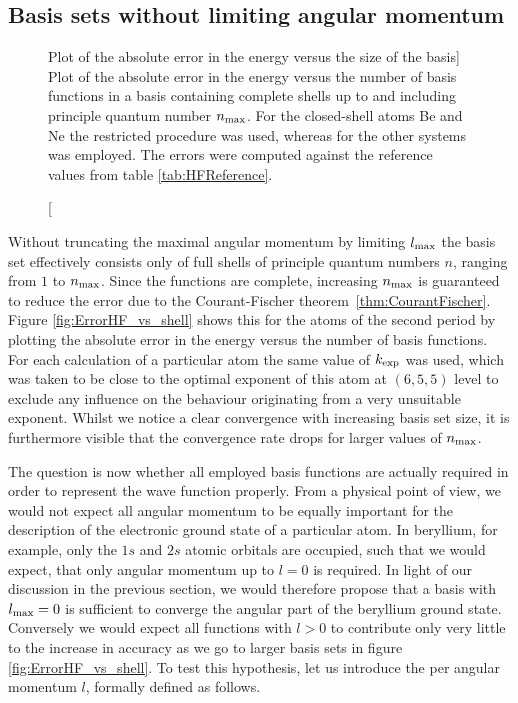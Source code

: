 %
%
\subsection{Basis sets without limiting angular momentum}
\begin{figure}
	\centering
	\caption
	[Plot of the absolute error in the \HF energy versus the size of the \CS basis]
	{
		Plot of the absolute error in the \HF energy versus the number of basis
		functions in a \CS basis containing complete shells
		up to and including principle quantum number $n_\text{max}$.
		For the closed-shell atoms Be and Ne
		the restricted \HF procedure was used,
		whereas for the other systems \UHF was employed.
		The errors were computed against the reference
		values from table \vref{tab:HFReference}.
}
	\label{fig:ErrorHF_vs_shell}
\end{figure}
Without truncating the maximal angular momentum by limiting $l_\text{max}$
the \CS basis set effectively consists only of full shells
of principle quantum numbers $n$, ranging from $1$ to $n_\text{max}$.
Since the \CS functions are complete, increasing $n_\text{max}$ is guaranteed
to reduce the error due to the Courant-Fischer theorem~\vref{thm:CourantFischer}.
Figure \vref{fig:ErrorHF_vs_shell} shows this for the atoms of the second period
by plotting the absolute error in the \HF energy
versus the number of basis functions.
For each calculation of a particular atom the same value of $k_\text{exp}$ was used,
which was taken to be close to the optimal exponent of this atom at $(6,5,5)$ level
to exclude any influence on the behaviour originating from a
very unsuitable exponent.
Whilst we notice a clear convergence with increasing basis set size,
it is furthermore visible that the convergence rate drops
for larger values of $n_\text{max}$.

The question is now whether all employed
basis functions are actually required
in order to represent the \HF wave function properly.
From a physical point of view,
we would not expect all angular momentum to be equally important
for the description of the electronic ground state of a particular atom.
In beryllium, for example, only the $1s$ and $2s$ atomic orbitals are occupied,
such that we would expect, that only angular momentum up to $l = 0$ is required.
In light of our discussion in the previous section,
we would therefore propose that a basis with $l_\text{max} = 0$ is sufficient
to converge the angular part of the beryllium ground state.
Conversely we would expect all \CS functions with $l > 0$
to contribute only very little to the increase in accuracy
as we go to larger basis sets in figure \vref{fig:ErrorHF_vs_shell}.
To test this hypothesis, let us introduce the
 per angular momentum $l$,
formally defined as follows.

